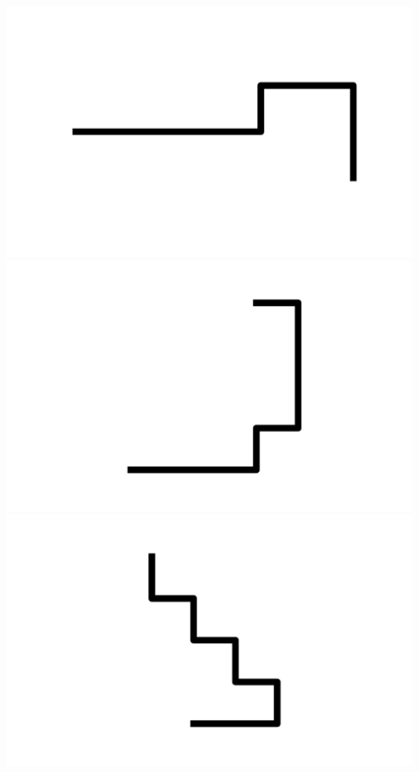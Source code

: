 \documentclass[]{report}
\begin{document}
\includegraphics[scale=.1]{pictures/21/state_cluster_shapes_289.pdf} 
\includegraphics[scale=.1]{pictures/21/state_cluster_shapes_290.pdf} 
\includegraphics[scale=.1]{pictures/21/state_cluster_shapes_291.pdf} 
\end{document}
